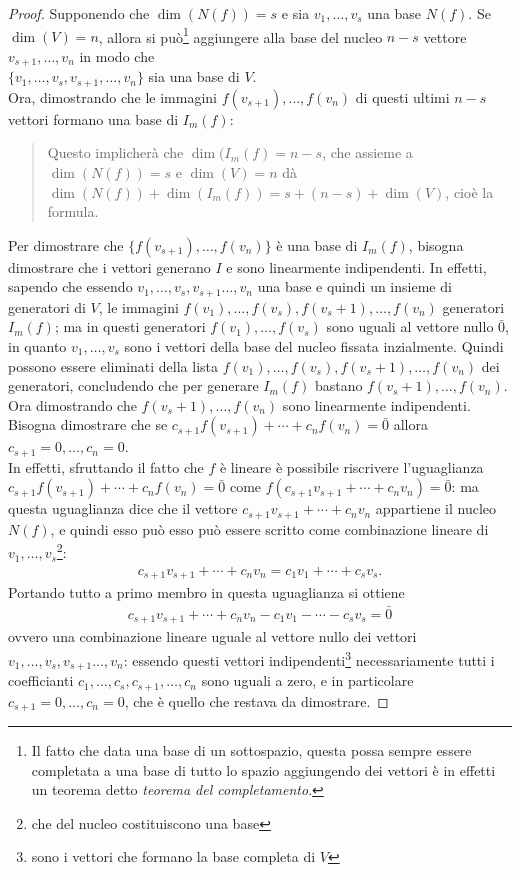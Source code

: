 \begin{proof}
  Supponendo che $\dim(N(f))=s$ e sia $v_1,\dots,v_s$ una base $N(f)$. Se $\dim(V)=n$, allora si
  può\footnote{Il fatto che data una base di un sottospazio, questa possa sempre essere completata
    a una base di tutto lo spazio aggiungendo dei vettori è in effetti un teorema detto \emph{teorema
      del completamento}.} aggiungere alla base del nucleo $n-s$ vettore $v_{s+1},\dots,v_n$ in modo
  che\\ $\{v_1,\dots,v_s,v_{s+1},\dots,v_n\}$ sia una base di $V$.\\
  Ora, dimostrando che le immagini $f(v_{s+1}),\dots,f(v_n)$ di questi ultimi $n-s$ vettori formano una
  base di $I_m(f)$:
  \begin{quote}
    Questo implicherà che $\dim(I_m(f)=n-s$, che assieme a $\dim(N(f))=s$ e $\dim(V)=n$ dà $\dim(N(f))+
    \dim(I_m(f))=s+(n-s)+\dim(V)$, cioè la formula.
  \end{quote}
  Per dimostrare che $\{f(v_{s+1}),\dots,f(v_n)\}$ è una base di $I_m(f)$, bisogna dimostrare che i
  vettori generano $I$ e sono linearmente indipendenti. In effetti, sapendo che essendo $v_1,\dots,v_s,
  v_{s+1}\dots, v_n$ una base e quindi un insieme di generatori di $V$, le immagini $f(v_1),\dots,f(v_s),
  f(v_s+1),\dots,f(v_n)$ generatori $I_m(f)$; ma in questi generatori $f(v_1),\dots,f(v_s)$ sono uguali
  al vettore nullo $\bar{0}$, in quanto $v_1,\dots,v_s$ sono i vettori della base del nucleo fissata
  inzialmente. Quindi possono essere eliminati della lista $f(v_1),\dots,f(v_s), f(v_s+1),\dots,f(v_n)$
  dei generatori, concludendo che per generare $I_m(f)$ bastano $f(v_s+1),\dots,f(v_n)$.\\
  Ora dimostrando che $f(v_s+1),\dots,f(v_n)$ sono linearmente indipendenti. Bisogna dimostrare che se
  $c_{s+1}f(v_{s+1})+\cdots+c_nf(v_n)=\bar{0}$ allora $c_{s+1}=0,\dots,c_n=0$.\\
  In effetti, sfruttando il fatto che $f$ è lineare è possibile riscrivere l'uguaglianza
  $c_{s+1}f(v_{s+1})+\cdots+c_nf(v_n)=\bar{0}$ come $f(c_{s+1}v_{s+1}+\cdots+c_nv_n)=\bar{0}$: ma questa
  uguaglianza dice che il vettore $c_{s+1}v_{s+1}+\cdots+c_nv_n$ appartiene il nucleo $N(f)$, e quindi
  esso può esso può essere scritto come combinazione lineare di $v_1,\dots,v_s$\footnote{che
    del nucleo costituiscono una base}:
  \begin{eqnarray*}
    c_{s+1}v_{s+1}+\cdots+c_nv_n=c_1v_1+\cdots+c_sv_s.
  \end{eqnarray*}
  Portando tutto a primo membro in questa uguaglianza si ottiene
  \begin{eqnarray*}
    c_{s+1}v_{s+1}+\cdots+c_nv_n-c_1v_1-\cdots-c_sv_s=\bar{0}
  \end{eqnarray*}
  ovvero una combinazione lineare uguale al vettore nullo dei vettori $v_1,\dots,v_s, v_{s+1}\dots, v_n$:
  essendo questi vettori indipendenti\footnote{sono i vettori che formano la base completa di $V$}
  necessariamente tutti i coefficianti $c_1,\dots,c_s,c_{s+1},\dots,c_n$ sono uguali a zero, e in
  particolare $c_{s+1}=0,\dots,c_n=0$, che è quello che restava da dimostrare.
\end{proof}
